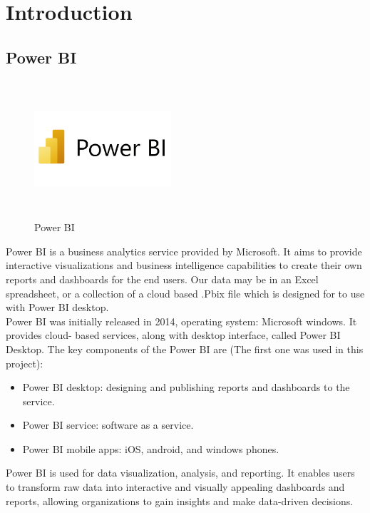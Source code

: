 
\chapter{Introduction}
\label{ch1}

\section{Power BI}

\begin{figure}[h]
    \centering
    \includegraphics[width=2.0in, height=2.0in]{Figure/power bi.jpg}
    \caption{Power BI }
    \label{fig:enter-label}
\end{figure}

Power BI is a business analytics service provided by Microsoft. It aims to provide interactive visualizations and business intelligence capabilities to create their own reports and
dashboards for the end users. Our data may be in an Excel spreadsheet, or a collection of a cloud based .Pbix file which is designed for to use with Power BI desktop.
\\ 
Power BI was initially released in 2014, operating system: Microsoft windows. It provides cloud- based services, along with desktop interface, called Power BI Desktop. The key components of the Power BI are (The first one was used in this project): 
\begin{itemize}
    \item Power BI desktop: designing and publishing reports and dashboards to the service.
    \item Power BI service: software as a service.
    \item Power BI mobile apps: iOS, android, and windows phones.
\end{itemize}
Power BI is used for data visualization, analysis, and reporting. It enables users to transform raw data into interactive and visually appealing dashboards and reports, allowing organizations to gain insights and make data-driven decisions.

